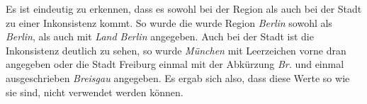 Es ist eindeutig zu erkennen, dass es sowohl bei der Region als auch bei der Stadt zu einer Inkonsistenz kommt. So wurde die wurde Region \emph{Berlin} sowohl als \emph{Berlin}, als auch mit \emph{Land Berlin} angegeben. Auch bei der Stadt ist die Inkonsistenz deutlich zu sehen, so wurde \emph{München} mit Leerzeichen vorne dran angegeben oder die Stadt Freiburg einmal mit der Abkürzung \emph{Br.} und einmal ausgeschrieben \emph{Breisgau} angegeben. Es ergab sich also, dass diese Werte so wie sie sind, nicht verwendet werden können.


